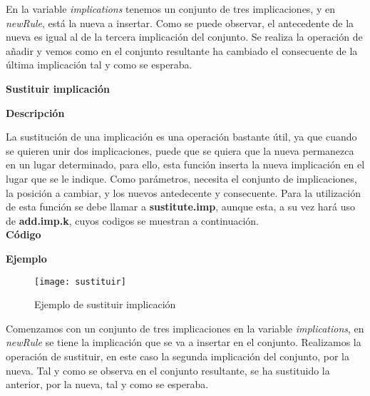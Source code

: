     En la variable \textit{implications} tenemos un conjunto de tres implicaciones, y en \textit{newRule}, est\'a la nueva a insertar. Como se puede 
    observar, el antecedente de la nueva es igual al de la tercera implicaci\'on del conjunto. Se realiza la operaci\'on de a\~nadir 
    y vemos como en el conjunto resultante ha cambiado el consecuente de la \'ultima implicaci\'on tal y como se esperaba.
    \\

    \bigskip


\textbf{ \large Sustituir implicaci\'on}

\smallskip

    \textbf{Descripci\'on}

    La sustituci\'on de una implicaci\'on es una operaci\'on bastante \'util, ya que cuando se quieren unir dos implicaciones, puede que 
    se quiera que la nueva permanezca en un lugar determinado, para ello, esta funci\'on inserta la nueva implicaci\'on en el lugar que 
    se le indique. Como par\'ametros, necesita el conjunto de implicaciones, la posici\'on a cambiar, y los nuevos antedecente y consecuente.
    Para la utilizaci\'on de esta funci\'on se debe llamar a \textbf{sustitute.imp}, aunque esta, a su vez har\'a uso de \textbf{add.imp.k}, cuyos codigos se 
    muestran a continuaci\'on.
    \\


    \textbf{C\'odigo}

    

    
    \clearpage

    \textbf{Ejemplo}

    \begin{figure}[H]
        \centering
        \texttt{[image: sustituir]}
        \caption{Ejemplo de sustituir implicaci\'on}
        \label{fig:sustituir}
    \end{figure}

    Comenzamos con un conjunto de tres implicaciones en la variable \textit{implications}, en \textit{newRule} se tiene la implicaci\'on que se va 
    a insertar en el conjunto. Realizamos la operaci\'on de sustituir, en este caso la segunda implicaci\'on del conjunto, por la nueva. 
    Tal y como se observa en el conjunto resultante, se ha sustituido la anterior, por la nueva, tal y como se esperaba.
    \\



